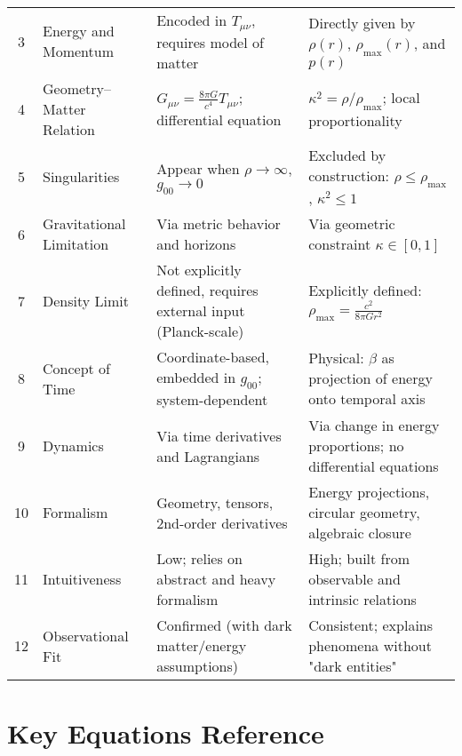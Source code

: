 \documentclass{article}
\begin{document}
\begin{theorem}
\begin{tabularx}{\textwidth}{@{}clXX@{}}
3 & Energy and Momentum & 
Encoded in \( T_{\mu\nu} \), requires model of matter & 
Directly given by \( \rho(r) \), \( \rho_{\text{max}}(r) \), and \( p(r) \) \\
\addlinespace

4 & Geometry–Matter Relation & 
\( G_{\mu\nu} = \frac{8\pi G}{c^4} T_{\mu\nu} \); differential equation & 
\( \kappa^2 = \rho / \rho_{\text{max}} \); local proportionality \\
\addlinespace

5 & Singularities & 
Appear when \( \rho \to \infty \), \( g_{00} \to 0 \) & 
Excluded by construction: \( \rho \leq \rho_{\text{max}} \), \( \kappa^2 \leq 1 \) \\
\addlinespace

6 & Gravitational Limitation & 
Via metric behavior and horizons & 
Via geometric constraint \( \kappa \in [0,1] \) \\
\addlinespace

7 & Density Limit & 
Not explicitly defined, requires external input (Planck-scale) & 
Explicitly defined: \( \rho_{\text{max}} = \frac{c^2}{8\pi G r^2} \) \\
\addlinespace

8 & Concept of Time & 
Coordinate-based, embedded in \( g_{00} \); system-dependent & 
Physical: \( \beta \) as projection of energy onto temporal axis \\
\addlinespace

9 & Dynamics & 
Via time derivatives and Lagrangians & 
Via change in energy proportions; no differential equations \\
\addlinespace

10 & Formalism & 
Geometry, tensors, 2nd-order derivatives & 
Energy projections, circular geometry, algebraic closure \\
\addlinespace

11 & Intuitiveness & 
Low; relies on abstract and heavy formalism & 
High; built from observable and intrinsic relations \\
\addlinespace

12 & Observational Fit & 
Confirmed (with dark matter/energy assumptions) & 
Consistent; explains phenomena without "dark entities" \\
\bottomrule
\end{tabularx}








\section{Key Equations Reference}


\end{theorem}
\end{document}
